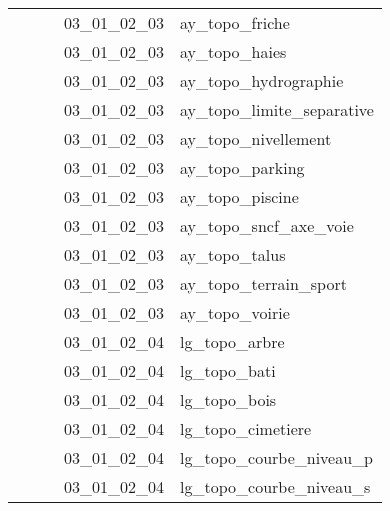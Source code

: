 \documentclass[12pt,titlepage]{book}
\begin{document}
\begin{supertabular}{|p{7.5cm}|p{7.5cm}|p{7.5cm}|c|p{10cm}|}
                   &                    &                    & 03\_01\_02\_03 & ay\_topo\_friche\\
                   &                    &                    & 03\_01\_02\_03 & ay\_topo\_haies\\
                   &                    &                    & 03\_01\_02\_03 & ay\_topo\_hydrographie\\
                   &                    &                    & 03\_01\_02\_03 & ay\_topo\_limite\_separative\\
                   &                    &                    & 03\_01\_02\_03 & ay\_topo\_nivellement\\
                   &                    &                    & 03\_01\_02\_03 & ay\_topo\_parking\\
                   &                    &                    & 03\_01\_02\_03 & ay\_topo\_piscine\\
                   &                    &                    & 03\_01\_02\_03 & ay\_topo\_sncf\_axe\_voie\\
                   &                    &                    & 03\_01\_02\_03 & ay\_topo\_talus\\
                   &                    &                    & 03\_01\_02\_03 & ay\_topo\_terrain\_sport\\
                   &                    &                    & 03\_01\_02\_03 & ay\_topo\_voirie\\
                   &                    &                    & 03\_01\_02\_04 & lg\_topo\_arbre\\
                   &                    &                    & 03\_01\_02\_04 & lg\_topo\_bati\\
                   &                    &                    & 03\_01\_02\_04 & lg\_topo\_bois\\
                   &                    &                    & 03\_01\_02\_04 & lg\_topo\_cimetiere\\
                   &                    &                    & 03\_01\_02\_04 & lg\_topo\_courbe\_niveau\_p\\
                   &                    &                    & 03\_01\_02\_04 & lg\_topo\_courbe\_niveau\_s\\

\end{supertabular}
\end{document}

